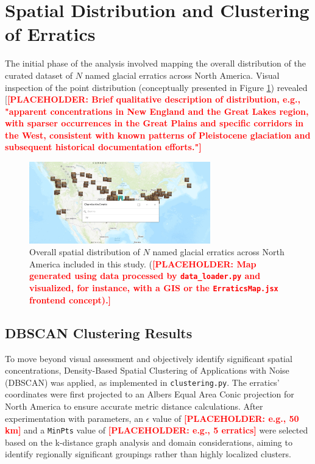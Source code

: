 \documentclass[
11pt, %
english, %
singlespacing, %
headsepline, %
]{MastersDoctoralThesis} %
\newcommand{\placeholdertext}[1]{\textcolor{red}{\textbf{[PLACEHOLDER: #1]}}}
\begin{document}
\section{Spatial Distribution and Clustering of Erratics}
\label{sec:spatial_distribution_clustering}

The initial phase of the analysis involved mapping the overall distribution of the curated dataset of $N$ named glacial erratics across North America. Visual inspection of the point distribution (conceptually presented in Figure \ref{fig:overall_distribution_map}) revealed [\placeholdertext{Brief qualitative description of distribution, e.g., "apparent concentrations in New England and the Great Lakes region, with sparser occurrences in the Great Plains and specific corridors in the West, consistent with known patterns of Pleistocene glaciation and subsequent historical documentation efforts."}

\begin{figure}[H]
    \centering
    \includegraphics[width=0.7\textwidth]{Images/DigitizedMap.png} %
    \caption{Overall spatial distribution of $N$ named glacial erratics across North America included in this study. (\placeholdertext{Map generated using data processed by \texttt{data\_loader.py} and visualized, for instance, with a GIS or the \texttt{ErraticsMap.jsx} frontend concept).}}
    \label{fig:overall_distribution_map}
\end{figure}

\subsection{DBSCAN Clustering Results}
\label{subsec:dbscan_results}
To move beyond visual assessment and objectively identify significant spatial concentrations, Density-Based Spatial Clustering of Applications with Noise (DBSCAN) was applied, as implemented in \texttt{clustering.py}. The erratics' coordinates were first projected to an Albers Equal Area Conic projection for North America to ensure accurate metric distance calculations. After experimentation with parameters, an $\epsilon$ value of \placeholdertext{e.g., 50 km} and a \texttt{MinPts} value of \placeholdertext{e.g., 5 erratics} were selected based on the k-distance graph analysis and domain considerations, aiming to identify regionally significant groupings rather than highly localized clusters.
\end{document}
